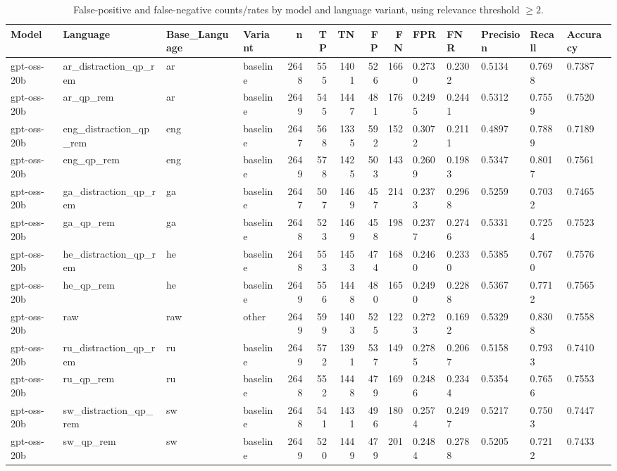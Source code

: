 \begin{table}
\caption{False-positive and false-negative counts/rates by model and language variant, using relevance threshold $\geq 2$.}
\label{tab:fp_fn_all_variants_2022}
\begin{tabular}{llllrrrrrlllll}
\toprule
Model & Language & Base_Language & Variant & n & TP & TN & FP & FN & FPR & FNR & Precision & Recall & Accuracy \\
\midrule
gpt-oss-20b & ar_distraction_qp_rem & ar & baseline & 2648 & 555 & 1401 & 526 & 166 & 0.2730 & 0.2302 & 0.5134 & 0.7698 & 0.7387 \\
gpt-oss-20b & ar_qp_rem & ar & baseline & 2649 & 545 & 1447 & 481 & 176 & 0.2495 & 0.2441 & 0.5312 & 0.7559 & 0.7520 \\
gpt-oss-20b & eng_distraction_qp_rem & eng & baseline & 2647 & 568 & 1335 & 592 & 152 & 0.3072 & 0.2111 & 0.4897 & 0.7889 & 0.7189 \\
gpt-oss-20b & eng_qp_rem & eng & baseline & 2649 & 578 & 1425 & 503 & 143 & 0.2609 & 0.1983 & 0.5347 & 0.8017 & 0.7561 \\
gpt-oss-20b & ga_distraction_qp_rem & ga & baseline & 2647 & 507 & 1469 & 457 & 214 & 0.2373 & 0.2968 & 0.5259 & 0.7032 & 0.7465 \\
gpt-oss-20b & ga_qp_rem & ga & baseline & 2648 & 523 & 1469 & 458 & 198 & 0.2377 & 0.2746 & 0.5331 & 0.7254 & 0.7523 \\
gpt-oss-20b & he_distraction_qp_rem & he & baseline & 2648 & 553 & 1453 & 474 & 168 & 0.2460 & 0.2330 & 0.5385 & 0.7670 & 0.7576 \\
gpt-oss-20b & he_qp_rem & he & baseline & 2649 & 556 & 1448 & 480 & 165 & 0.2490 & 0.2288 & 0.5367 & 0.7712 & 0.7565 \\
gpt-oss-20b & raw & raw & other & 2649 & 599 & 1403 & 525 & 122 & 0.2723 & 0.1692 & 0.5329 & 0.8308 & 0.7558 \\
gpt-oss-20b & ru_distraction_qp_rem & ru & baseline & 2649 & 572 & 1391 & 537 & 149 & 0.2785 & 0.2067 & 0.5158 & 0.7933 & 0.7410 \\
gpt-oss-20b & ru_qp_rem & ru & baseline & 2648 & 552 & 1448 & 479 & 169 & 0.2486 & 0.2344 & 0.5354 & 0.7656 & 0.7553 \\
gpt-oss-20b & sw_distraction_qp_rem & sw & baseline & 2648 & 541 & 1431 & 496 & 180 & 0.2574 & 0.2497 & 0.5217 & 0.7503 & 0.7447 \\
gpt-oss-20b & sw_qp_rem & sw & baseline & 2649 & 520 & 1449 & 479 & 201 & 0.2484 & 0.2788 & 0.5205 & 0.7212 & 0.7433 \\

\end{tabular}
\end{table}
